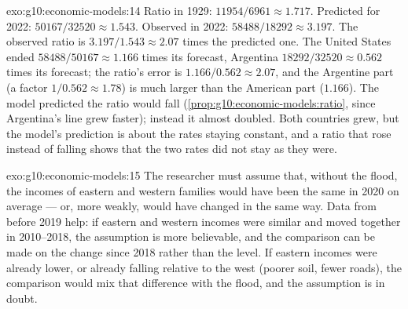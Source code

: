 \begin{solution}{exo:g10:economic-models:14}
Ratio in 1929: $11954/6961 \approx 1.717$. Predicted for 2022: $50167/32520 \approx 1.543$. Observed in
2022: $58488/18292 \approx 3.197$. The observed ratio is $3.197/1.543 \approx 2.07$ times the
predicted one. The United States ended $58488/50167 \approx 1.166$ times its forecast, Argentina
$18292/32520 \approx 0.562$ times its forecast; the ratio's error is $1.166/0.562 \approx 2.07$, and
the Argentine part (a factor $1/0.562 \approx 1.78$) is much larger than the American part ($1.166$).
The model predicted the ratio would fall (\cref{prop:g10:economic-models:ratio}, since Argentina's line
grew faster); instead it almost doubled. Both countries grew, but the model's prediction is about the
rates staying constant, and a ratio that rose instead of falling shows that the two rates did not stay
as they were.
\end{solution}

\begin{solution}{exo:g10:economic-models:15}
The researcher must assume that, without the flood, the incomes of eastern and western families would
have been the same in 2020 on average --- or, more weakly, would have changed in the same way. Data from
before 2019 help: if eastern and western incomes were similar and moved together in 2010--2018, the
assumption is more believable, and the comparison can be made on the change since 2018 rather than the
level. If eastern incomes were already lower, or already falling relative to the west (poorer soil,
fewer roads), the comparison would mix that difference with the flood, and the assumption is in doubt.
\end{solution}

